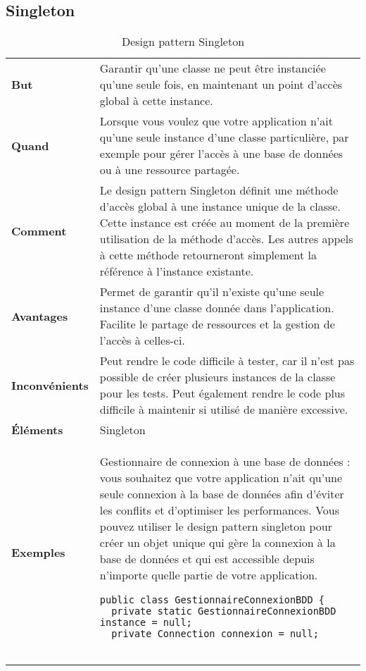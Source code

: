 \subsection{Singleton}
\begin{table}[H]
\caption{Design pattern Singleton}
\label{tbl:design_pattern_singleton}
\begin{adjustbox}{max width=\textwidth}
\begin{tabular}{l|p{\textwidth}}
\toprule
\textbf{But} & Garantir qu'une classe ne peut être instanciée qu'une seule fois, en maintenant un point d'accès global à cette instance.\\
\cmidrule(lr){1-2}
\textbf{Quand} & Lorsque vous voulez que votre application n'ait qu'une seule instance d'une classe particulière, par exemple pour gérer l'accès à une base de données ou à une ressource partagée.\\
\cmidrule(lr){1-2}
\textbf{Comment} & Le design pattern Singleton définit une méthode d'accès global à une instance unique de la classe. Cette instance est créée au moment de la première utilisation de la méthode d'accès. Les autres appels à cette méthode retourneront simplement la référence à l'instance existante.\\
\cmidrule(lr){1-2}
\textbf{Avantages} & Permet de garantir qu'il n'existe qu'une seule instance d'une classe donnée dans l'application. Facilite le partage de ressources et la gestion de l'accès à celles-ci.\\
\cmidrule(lr){1-2}
\textbf{Inconvénients} & Peut rendre le code difficile à tester, car il n'est pas possible de créer plusieurs instances de la classe pour les tests. Peut également rendre le code plus difficile à maintenir si utilisé de manière excessive.\\
\cmidrule{1-2}
\textbf{\'El\'ements} & Singleton \\
\cmidrule(lr){1-2}
\textbf{Exemples} &
\hspace{4mm}
\begin{minipage}[tl]{0.5\textwidth}
\begin{minipage}[t]{1\textwidth}
Gestionnaire de connexion à une base de données : vous souhaitez que votre application n'ait qu'une seule connexion à la base de données afin d'éviter les conflits et d'optimiser les performances. Vous pouvez utiliser le design pattern singleton pour créer un objet unique qui gère la connexion à la base de données et qui est accessible depuis n'importe quelle partie de votre application.
\end{minipage}
\begin{minipage}[b]{1\textwidth}
\begin{lstlisting}[style=monstyle]
public class GestionnaireConnexionBDD {
  private static GestionnaireConnexionBDD instance = null;
  private Connection connexion = null;


\end{lstlisting}
\end{minipage}
\end{minipage}
\end{tabular}
\end{adjustbox}
\end{table}
